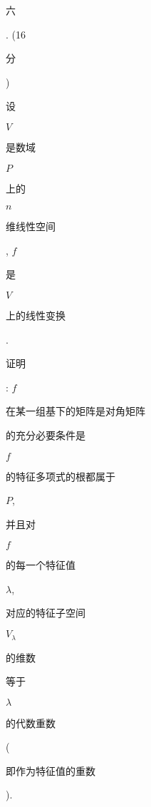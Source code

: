 \documentclass[10pt]{article}
\begin{document}
\begin{CJK}{UTF8}{mj}六\end{CJK}. (16 \begin{CJK}{UTF8}{mj}分\end{CJK}) \begin{CJK}{UTF8}{mj}设\end{CJK} $V$ \begin{CJK}{UTF8}{mj}是数域\end{CJK} $P$ \begin{CJK}{UTF8}{mj}上的\end{CJK} $n$ \begin{CJK}{UTF8}{mj}维线性空间\end{CJK}, $f$ \begin{CJK}{UTF8}{mj}是\end{CJK} $V$ \begin{CJK}{UTF8}{mj}上的线性变换\end{CJK}. \begin{CJK}{UTF8}{mj}证明\end{CJK}: $f$ \begin{CJK}{UTF8}{mj}在某一组基下的矩阵是对角矩阵\end{CJK} \begin{CJK}{UTF8}{mj}的充分必要条件是\end{CJK} $f$ \begin{CJK}{UTF8}{mj}的特征多项式的根都属于\end{CJK} $P$, \begin{CJK}{UTF8}{mj}并且对\end{CJK} $f$ \begin{CJK}{UTF8}{mj}的每一个特征值\end{CJK} $\lambda$, \begin{CJK}{UTF8}{mj}对应的特征子空间\end{CJK} $V_{\lambda}$ \begin{CJK}{UTF8}{mj}的维数\end{CJK} \begin{CJK}{UTF8}{mj}等于\end{CJK} $\lambda$ \begin{CJK}{UTF8}{mj}的代数重数\end{CJK} (\begin{CJK}{UTF8}{mj}即作为特征值的重数\end{CJK}).
\end{document}
